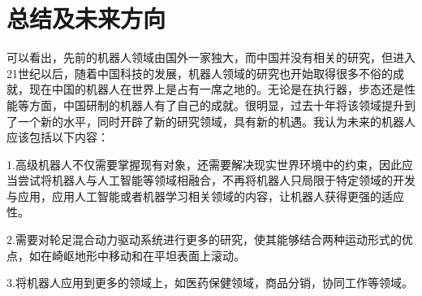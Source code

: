 \documentclass[12pt,a4paper]{ctexart}
\begin{document}
\section{总结及未来方向}
可以看出，先前的机器人领域由国外一家独大，而中国并没有相关的研究，但进入21世纪以后，随着中国科技的发展，机器人领域的研究也开始取得很多不俗的成就，现在中国的机器人在世界上是占有一席之地的。无论是在执行器，步态还是性能等方面，中国研制的机器人有了自己的成就。很明显，过去十年将该领域提升到了一个新的水平，同时开辟了新的研究领域，具有新的机遇。我认为未来的机器人应该包括以下内容：

1.高级机器人不仅需要掌握现有对象，还需要解决现实世界环境中的约束，因此应当尝试将机器人与人工智能等领域相融合，不再将机器人只局限于特定领域的开发与应用，应用人工智能或者机器学习相关领域的内容，让机器人获得更强的适应性。

2.需要对轮足混合动力驱动系统进行更多的研究，使其能够结合两种运动形式的优点，如在崎岖地形中移动和在平坦表面上滚动。

3.将机器人应用到更多的领域上，如医药保健领域，商品分销，协同工作等领域。

\newpage
\small
\end{document}
